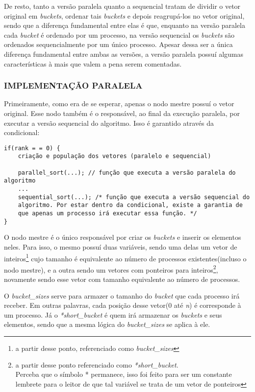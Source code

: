 	De resto, tanto a versão paralela quanto a sequencial tratam de dividir o vetor original em \textit{buckets}, ordenar tais \textit{buckets} e depois reagrupá-los no vetor original, sendo que a diferença fundamental entre elas é que, enquanto na versão paralela cada \textit{bucket} é ordenado por um processo, na versão sequencial os \textit{buckets} são ordenados sequencialmente por um único processo. Apesar dessa ser a única diferença fundamental entre ambas as versões, a versão paralela possuí algumas características à mais que valem a pena serem comentadas.
	
		\subsubsection{\normalsize IMPLEMENTAÇÃO PARALELA}
			Primeiramente, como era de se esperar, apenas o nodo mestre possuí o vetor original. Esse nodo também é o responsável, ao final da execução paralela, por executar a versão sequencial do algoritmo. Isso é garantido através da condicional:
			\newpage
			\begin{lstlisting}[style=C] 			
if(rank = = 0) {
	criação e população dos vetores (paralelo e sequencial)
	
	parallel_sort(...); // função que executa a versão paralela do algoritmo
	...
	sequential_sort(...); /* função que executa a versão sequencial do 
	algoritmo. Por estar dentro da condicional, existe a garantia de 
	que apenas um processo irá executar essa função. */
}
\end{lstlisting}
			
			O nodo mestre é o único responsável por criar os \textit{buckets} e inserir os elementos neles. Para isso, o mesmo possuí duas variáveis, sendo uma delas um vetor de inteiros\footnote{a partir desse ponto, referenciado como \textit{bucket\_sizes}} cujo tamanho é equivalente ao número de processos existentes(incluso o nodo mestre), e a outra sendo um vetores com ponteiros para inteiros\footnote{a partir desse ponto referenciado como \textit{*short\_bucket}.\\Perceba que o símbolo * permanece, isso foi feito para ser um constante lembrete para o leitor de que tal variável se trata de um vetor de ponteiros}, novamente sendo esse vetor com tamanho equivalente ao número de processos.
			
			
			O \textit{bucket\_sizes} serve para armazer o tamanho do \textit{bucket} que cada processo irá receber. Em outras palavras, cada posição desse vetor(0 até \textit{n}) é corresponde à um processo. Já o \textit{*short\_bucket} é quem irá armazenar os \textit{buckets} e seus elementos, sendo que a mesma lógica do \textit{bucket\_sizes} se aplica à ele.
			
